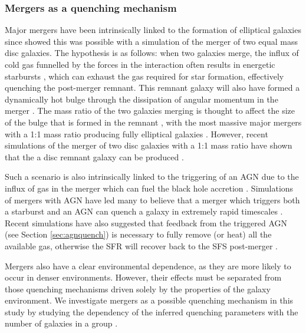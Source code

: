 \documentclass[useAMS,usenatbib]{mn2e}
\begin{document}
\subsubsection{Mergers as a quenching mechanism}\label{sec:mergersquench}

Major mergers have been intrinsically linked to the formation of elliptical galaxies since \citet{toomre72} showed this was possible with a simulation of the merger of two equal mass disc galaxies. The hypothesis is as follows: when two galaxies merge, the influx of cold gas funnelled by the forces in the interaction often results in energetic starbursts \citep{mihos94, mihos96, hopkins06d, hopkins08a, hopkins08b, snyder11, hayward14, sparre16}, which can exhaust the gas required for star formation, effectively quenching the post-merger remnant. This remnant galaxy will also have formed a dynamically hot bulge through the dissipation of angular momentum in the merger \citep{toomre77, walker96, kormendy04, hopkins11c, martig12}. The mass ratio of the two galaxies merging is thought to affect the size of the bulge that is formed in the remnant \citep{cox08, hopkins09c, tonini16}, with the most massive major mergers with a 1:1 mass ratio producing fully elliptical galaxies \citep{toomre72, barnes96, mihos96, kauffmann96, pontzen16}. However, recent simulations of the merger of two disc galaxies with a 1:1 mass ratio have shown that the a disc remnant galaxy can be produced \citep{pontzen16, sparre16}. 

Such a scenario is also intrinsically linked to the triggering of an AGN due to the influx of gas in the merger which can fuel the black hole accretion \citep{sanders88, dimatteo05, hopkins09a, treister12}. Simulations of mergers with AGN have led many to believe that a merger which triggers both a starburst and an AGN can quench a galaxy in extremely rapid timescales \citep{springel05b, bell06}. Recent simulations have also suggested that feedback from the triggered AGN (see Section \ref{sec:agnquench}) is necessary to fully remove (or heat) all the available gas, otherwise the SFR will recover back to the SFS post-merger \citep{athanassoula16, pontzen16, sparre16}. 

Mergers also have a clear environmental dependence, as they are more likely to occur in denser environments. However, their effects must be separated from those quenching mechanisms driven solely by the properties of the galaxy environment. We investigate mergers as a possible quenching mechanism in this study by studying the dependency of the inferred quenching parameters with the number of galaxies in a group . 
\end{document}
